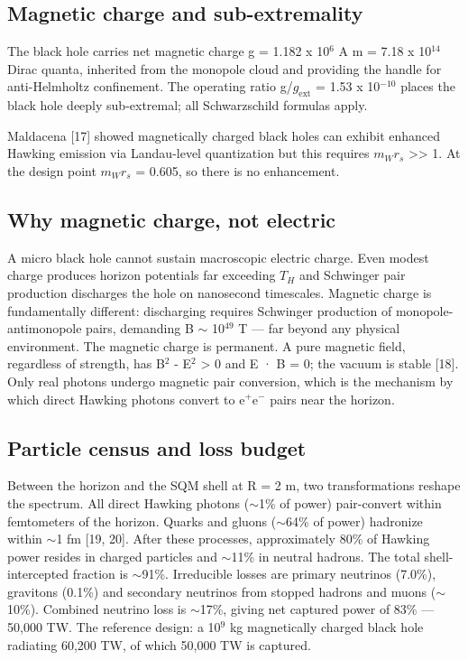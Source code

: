 \documentclass[12pt,a4paper]{article}
\begin{document}
\subsection{Magnetic charge and sub-extremality}
The black hole carries net magnetic charge g = 1.182 x 10$^{6}$ A m = 7.18 x 10$^{14}$ Dirac quanta, inherited from the monopole cloud and providing the handle for anti-Helmholtz confinement. The operating ratio g/$g_{\text{ext}}$ = 1.53 x 10$^{-10}$ places the black hole deeply sub-extremal; all Schwarzschild formulas apply.

Maldacena [17] showed magnetically charged black holes can exhibit enhanced Hawking emission via Landau-level quantization but this requires $m_W r_s$ >> 1. At the design point $m_W r_s$ = 0.605, so there is no enhancement.

\subsection{Why magnetic charge, not electric}
A micro black hole cannot sustain macroscopic electric charge. Even modest charge produces horizon potentials far exceeding $T_H$ and Schwinger pair production discharges the hole on nanosecond timescales. Magnetic charge is fundamentally different: discharging requires Schwinger production of monopole-antimonopole pairs, demanding B $\sim$ 10$^{49}$ T --- far beyond any physical environment. The magnetic charge is permanent. A pure magnetic field, regardless of strength, has B$^{2}$ - E$^{2}$ > 0 and E · B = 0; the vacuum is stable [18]. Only real photons undergo magnetic pair conversion, which is the mechanism by which direct Hawking photons convert to e$^{+}$e$^{-}$ pairs near the horizon.

\subsection{Particle census and loss budget}
Between the horizon and the SQM shell at R = 2 m, two transformations reshape the spectrum. All direct Hawking photons ($\sim$1\% of power) pair-convert within femtometers of the horizon. Quarks and gluons ($\sim$64\% of power) hadronize within $\sim$1 fm [19, 20]. After these processes, approximately 80\% of Hawking power resides in charged particles and $\sim$11\% in neutral hadrons. The total shell-intercepted fraction is $\sim$91\%. Irreducible losses are primary neutrinos (7.0\%), gravitons (0.1\%) and secondary neutrinos from stopped hadrons and muons ($\sim$10\%). Combined neutrino loss is $\sim$17\%, giving net captured power of 83\% --- 50,000 TW. The reference design: a 10$^{9}$ kg magnetically charged black hole radiating 60,200 TW, of which 50,000 TW is captured.
\end{document}
